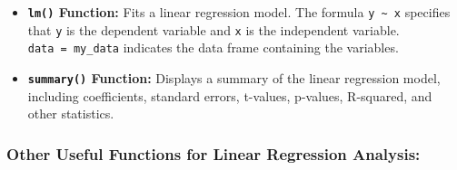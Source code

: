 \documentclass[
]{article}
\begin{document}
\begin{itemize}
\item
  \textbf{\texttt{lm()} Function:} Fits a linear regression model. The
  formula \texttt{y\ \textasciitilde{}\ x} specifies that \texttt{y} is
  the dependent variable and \texttt{x} is the independent variable.
  \texttt{data\ =\ my\_data} indicates the data frame containing the
  variables.
\item
  \textbf{\texttt{summary()} Function:} Displays a summary of the linear
  regression model, including coefficients, standard errors, t-values,
  p-values, R-squared, and other statistics.
\end{itemize}

\hypertarget{other-useful-functions-for-linear-regression-analysis}{%
\subsubsection{Other Useful Functions for Linear Regression
Analysis:}\label{other-useful-functions-for-linear-regression-analysis}}
\end{document}
